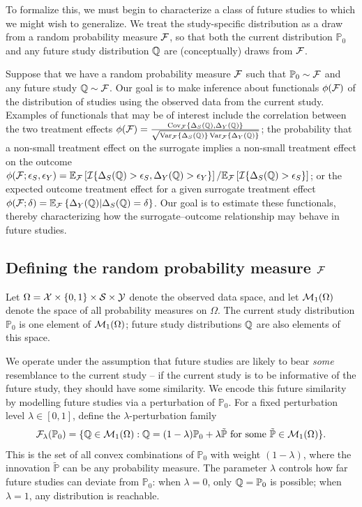 \documentclass{article}
\newcommand{\PP}{\mathbb{P}}
\begin{document}
To formalize this, we must begin to characterize a class of future studies to which we might wish to generalize. We treat the study-specific distribution as a draw from a random probability measure $\mathcal{F}$, so that both the current distribution $\PP_0$ and any future study distribution $\mathbb{Q}$ are (conceptually) draws from $\mathcal{F}$.

Suppose that we have a random probability measure $\mathcal{F}$ such that $\PP_0 \sim \cF$ and any future study $\mathbb{Q} \sim \mathcal{F}$. Our goal is to make inference about functionals $\phi(\mathcal{F})$ of the distribution of studies using the observed data from the current study. Examples of functionals that may be of interest include the correlation between the two treatment effects $\phi(\mathcal{F}) = \frac{\operatorname{Cov}_{\mathcal{F}}\{\Delta_S(\mathbb{Q}), \Delta_Y(\mathbb{Q})\}}{\sqrt{\operatorname{Var}_{\mathcal{F}}\{\Delta_S(\mathbb{Q})\}\operatorname{Var}_{\mathcal{F}}\{\Delta_Y(\mathbb{Q})\}}}$; the probability that a non-small treatment effect on the surrogate implies a non-small treatment effect on the outcome $\phi(\mathcal{F}; \epsilon_S, \epsilon_Y) = \mathbb{E}_{\mathcal{F}}\left[ \mathcal{I}\{ \Delta_S(\mathbb{Q}) > \epsilon_S, \Delta_Y(\mathbb{Q}) > \epsilon_Y\} \right] / \mathbb{E}_{\mathcal{F}}\left[ \mathcal{I}\{ \Delta_S(\mathbb{Q}) > \epsilon_S\} \right]$; or the expected outcome treatment effect for a given surrogate treatment effect $\phi(\mathcal{F}; \delta) = \mathbb{E}_{\mathcal{F}}\left\{\Delta_Y(\mathbb{Q}) | \Delta_S(\mathbb{Q}) = \delta\right\}$. Our goal is to estimate these functionals, thereby characterizing how the surrogate--outcome relationship may behave in future studies.

\subsection{Defining the random probability measure $\mathcal{F}$}

Let $\Omega = \mathcal{X} \times \{0,1\} \times \mathcal{S} \times \mathcal{Y}$ denote the observed data space, and let $\mathcal{M}_1(\Omega)$ denote the space of all probability measures on $\Omega$. The current study distribution $\PP_0$ is one element of $\mathcal{M}_1(\Omega)$; future study distributions $\mathbb{Q}$ are also elements of this space.

We operate under the assumption that future studies are likely to bear \emph{some} resemblance to the current study -- if the current study is to be informative of the future study, they should have some similarity. We encode this future similarity by modelling future studies via a perturbation of $\PP_0$. For a fixed perturbation level $\lambda \in [0,1]$, define the $\lambda$-perturbation family
\begin{align*}
    \cF_\lambda(\PP_0) = \{\Q \in \cM_1(\Omega) : \Q = (1-\lambda)\PP_0 + \lambda\tilde{\PP} \text{ for some } \tilde{\PP} \in \cM_1(\Omega)\}.
\end{align*}
This is the set of all convex combinations of $\PP_0$ with weight $(1-\lambda)$, where the innovation $\tilde{\PP}$ can be any probability measure. The parameter $\lambda$ controls how far future studies can deviate from $\PP_0$: when $\lambda = 0$, only $\Q = \PP_0$ is possible; when $\lambda = 1$, any distribution is reachable.
\end{document}
